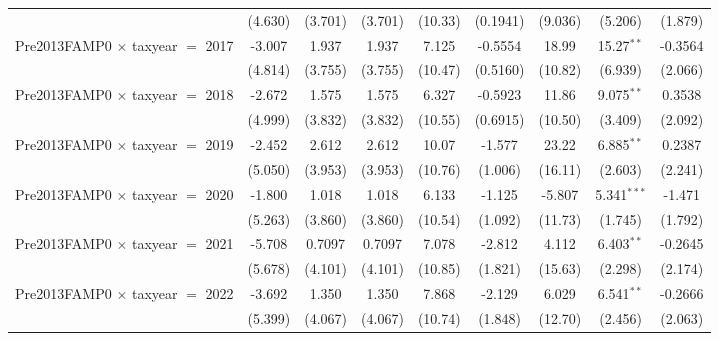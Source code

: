 \begin{tabular}{lcccccccc}
                                           & (4.630)       & (3.701)       & (3.701)       & (10.33)       & (0.1941)       & (9.036)       & (5.206)       & (1.879)\\   
   Pre2013FAMP0 $\times$ taxyear $=$ 2017  & -3.007        & 1.937         & 1.937         & 7.125         & -0.5554        & 18.99         & 15.27$^{**}$  & -0.3564\\   
                                           & (4.814)       & (3.755)       & (3.755)       & (10.47)       & (0.5160)       & (10.82)       & (6.939)       & (2.066)\\   
   Pre2013FAMP0 $\times$ taxyear $=$ 2018  & -2.672        & 1.575         & 1.575         & 6.327         & -0.5923        & 11.86         & 9.075$^{**}$  & 0.3538\\   
                                           & (4.999)       & (3.832)       & (3.832)       & (10.55)       & (0.6915)       & (10.50)       & (3.409)       & (2.092)\\   
   Pre2013FAMP0 $\times$ taxyear $=$ 2019  & -2.452        & 2.612         & 2.612         & 10.07         & -1.577         & 23.22         & 6.885$^{**}$  & 0.2387\\   
                                           & (5.050)       & (3.953)       & (3.953)       & (10.76)       & (1.006)        & (16.11)       & (2.603)       & (2.241)\\   
   Pre2013FAMP0 $\times$ taxyear $=$ 2020  & -1.800        & 1.018         & 1.018         & 6.133         & -1.125         & -5.807        & 5.341$^{***}$ & -1.471\\   
                                           & (5.263)       & (3.860)       & (3.860)       & (10.54)       & (1.092)        & (11.73)       & (1.745)       & (1.792)\\   
   Pre2013FAMP0 $\times$ taxyear $=$ 2021  & -5.708        & 0.7097        & 0.7097        & 7.078         & -2.812         & 4.112         & 6.403$^{**}$  & -0.2645\\   
                                           & (5.678)       & (4.101)       & (4.101)       & (10.85)       & (1.821)        & (15.63)       & (2.298)       & (2.174)\\   
   Pre2013FAMP0 $\times$ taxyear $=$ 2022  & -3.692        & 1.350         & 1.350         & 7.868         & -2.129         & 6.029         & 6.541$^{**}$  & -0.2666\\   
                                           & (5.399)       & (4.067)       & (4.067)       & (10.74)       & (1.848)        & (12.70)       & (2.456)       & (2.063)\\   

\end{tabular}
